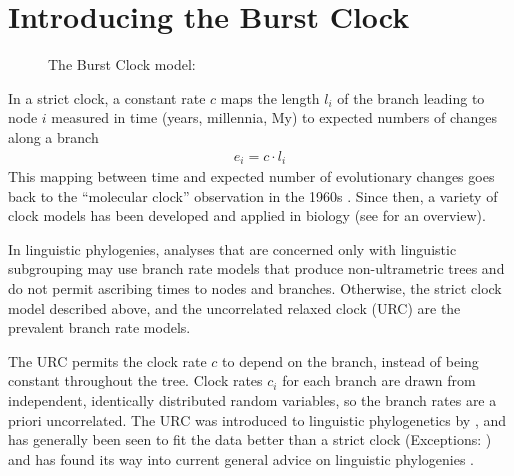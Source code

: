 \documentclass[a4paper,12pt]{scrartcl}
\begin{document}
\section{Introducing the Burst Clock}
\begin{figure}
    \centering
    \caption{The Burst Clock model: }
    \label{fig:burstclock}
\end{figure}
\label{sec:description}
In a strict clock,
a constant rate $c$ maps the length $l_i$ of the branch leading to node $i$
measured in time (years, millennia, My) to expected numbers of changes
along a branch
\begin{align}
  e_i = c \cdot l_i
  \label{eq:strict}
\end{align}
This mapping between time and expected number of evolutionary changes goes back
to the “molecular clock” observation in the 1960s
\parencite{zuckerkandl1965evolutionary}. Since then, a variety of clock models
has been developed and applied in biology (see \textcite{ho2014molecularclock} for an
overview).

In linguistic phylogenies,
analyses that are
concerned only with linguistic subgrouping may use branch rate models that
produce non-ultrametric trees and do not permit ascribing times to nodes and
branches.
Otherwise, the strict clock model described above, and the uncorrelated relaxed
clock (URC) are the prevalent branch rate models.

The URC \parencite{drummond2006relaxed} permits the clock rate $c$ to depend on
the branch, instead of being constant throughout the tree. Clock
rates $c_i$ for each branch are drawn from independent, identically distributed random
variables, so the branch rates are a priori uncorrelated.
The URC was introduced to linguistic
phylogenetics by \textcite{kitchen2009bayesian}, and has generally been seen to
fit the data better than a strict clock
\parencite{bouckaert2012mapping,honkola2013cultural,lee2013evolution}
(Exceptions: \textcite{savelyev2020bayesian,kaiping2021systematic})
and has found its way into current general advice on linguistic phylogenies
\parencite{maurits2017beastling,hoffmann2021bayesian}.
\end{document}
